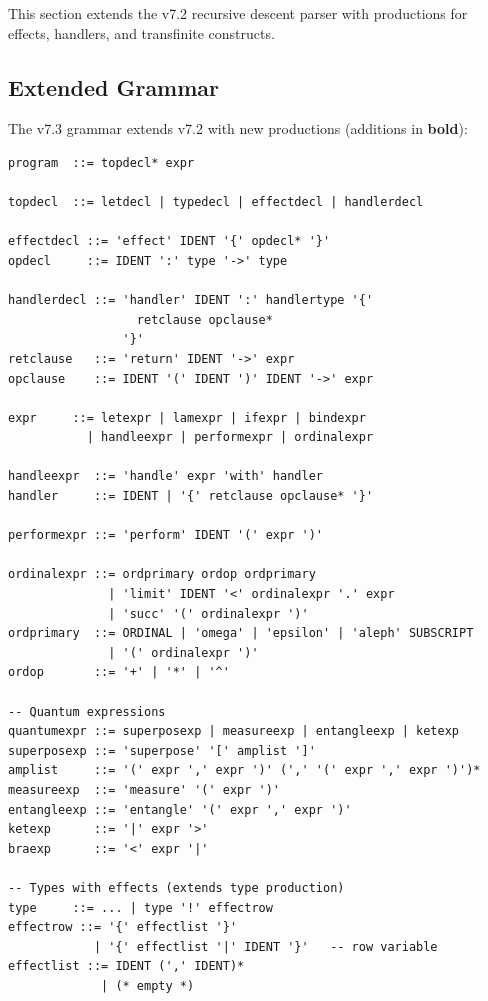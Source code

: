 This section extends the v7.2 recursive descent parser with productions for effects, handlers, and transfinite constructs.

\subsection{Extended Grammar}
\label{subsec:extended-grammar}

\begin{definition}
\label{def:grammar-v73}
The v7.3 grammar extends v7.2 with new productions (additions in \textbf{bold}):
\begin{verbatim}
program  ::= topdecl* expr

topdecl  ::= letdecl | typedecl | effectdecl | handlerdecl

effectdecl ::= 'effect' IDENT '{' opdecl* '}'
opdecl     ::= IDENT ':' type '->' type

handlerdecl ::= 'handler' IDENT ':' handlertype '{'
                  retclause opclause*
                '}'
retclause   ::= 'return' IDENT '->' expr
opclause    ::= IDENT '(' IDENT ')' IDENT '->' expr

expr     ::= letexpr | lamexpr | ifexpr | bindexpr
           | handleexpr | performexpr | ordinalexpr

handleexpr  ::= 'handle' expr 'with' handler
handler     ::= IDENT | '{' retclause opclause* '}'

performexpr ::= 'perform' IDENT '(' expr ')'

ordinalexpr ::= ordprimary ordop ordprimary
              | 'limit' IDENT '<' ordinalexpr '.' expr
              | 'succ' '(' ordinalexpr ')'
ordprimary  ::= ORDINAL | 'omega' | 'epsilon' | 'aleph' SUBSCRIPT
              | '(' ordinalexpr ')'
ordop       ::= '+' | '*' | '^'

-- Quantum expressions
quantumexpr ::= superposexp | measureexp | entangleexp | ketexp
superposexp ::= 'superpose' '[' amplist ']'
amplist     ::= '(' expr ',' expr ')' (',' '(' expr ',' expr ')')*
measureexp  ::= 'measure' '(' expr ')'
entangleexp ::= 'entangle' '(' expr ',' expr ')'
ketexp      ::= '|' expr '>'
braexp      ::= '<' expr '|'

-- Types with effects (extends type production)
type     ::= ... | type '!' effectrow
effectrow ::= '{' effectlist '}'
            | '{' effectlist '|' IDENT '}'   -- row variable
effectlist ::= IDENT (',' IDENT)*
             | (* empty *)
\end{verbatim}
\end{definition}

